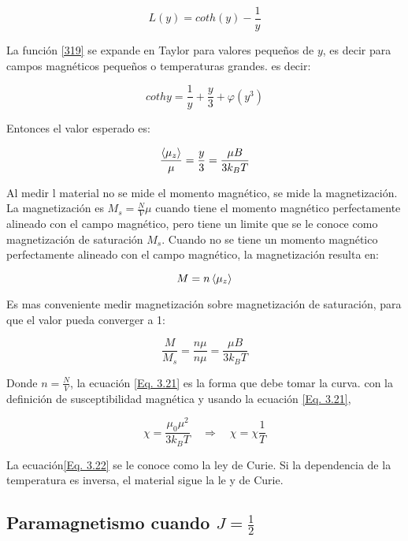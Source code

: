 \documentclass[11pt,fleqn]{book}
\begin{document}
\begin{equation}
    L(y)=coth(y)-\frac{1}{y}
    \label{Eq. 3.19}
\end{equation}

La función \ref{319} se expande en Taylor para valores pequeños de $y$, es decir para campos magnéticos pequeños o temperaturas grandes. es decir:

\begin{equation*}
    cothy=\frac{1}{y}+\frac{y}{3}+\varphi(y^{3})
\end{equation*}

Entonces el valor esperado es:

\begin{equation}
    \frac{\braket{\mu_{z}}}{\mu}=\frac{y}{3}=\frac{\mu B}{3k_{B}T}
    \label{Eq. 3.20}
\end{equation}

Al medir l material no se mide el momento magnético, se mide la magnetización. La magnetización es $M_{s}=\frac{N}{V}\mu$ cuando tiene el momento magnético perfectamente alineado con el campo magnético, pero tiene un limite que se le conoce como magnetización de saturación $M_{s}$. Cuando no se tiene un momento magnético perfectamente alineado con el campo magnético, la magnetización resulta en:

\begin{equation*}
    M=n\braket{\mu_{z}}
\end{equation*}
        
Es mas conveniente medir magnetización sobre magnetización de saturación, para que el valor pueda converger a 1:

\begin{equation}
    \frac{M}{M_{s}}=\frac{n\mu}{n\mu}=\frac{\mu B}{3k_{B}T}
    \label{Eq. 3.21}
\end{equation}
        
Donde $n=\frac{N}{V}$, la ecuación \ref{Eq. 3.21} es la forma que debe tomar la curva. con la definición de susceptibilidad magnética y usando la ecuación \ref{Eq. 3.21},

\begin{equation}
    \chi=\frac{\mu_{0}\mu^{2}}{3k_{B}T}\quad\Longrightarrow\quad\chi=\chi\frac{1}{T}
    \label{Eq. 3.22}
\end{equation}
  
La ecuación\ref{Eq. 3.22} se le conoce como la ley de Curie. Si la dependencia de la temperatura es inversa, el material sigue la le y de Curie.

\subsection{Paramagnetismo cuando $J=\frac{1}{2}$}
\end{document}
